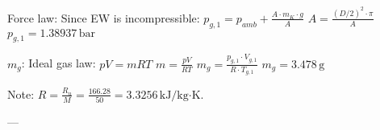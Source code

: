 Force law:  
Since EW is incompressible:  
\( p_{g,1} = p_{amb} + \frac{A \cdot m_K \cdot g}{A} \)  
\( A = \frac{(D/2)^2 \cdot \pi}{A} \)  
\( p_{g,1} = 1.38937 \, \text{bar} \)  

\( m_g \): Ideal gas law:  
\( pV = mRT \)  
\( m = \frac{pV}{RT} \)  
\( m_g = \frac{p_{g,1} \cdot V_{g,1}}{R \cdot T_{g,1}} \)  
\( m_g = 3.478 \, \text{g} \)  

Note: \( R = \frac{R_u}{M} = \frac{166.28}{50} = 3.3256 \, \text{kJ/kg·K} \).  

---